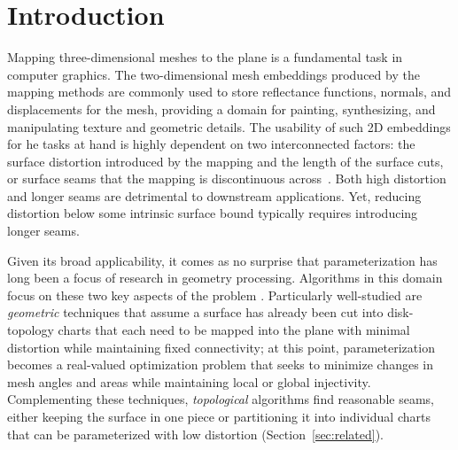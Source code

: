 
\section{Introduction}
Mapping three-dimensional meshes to the plane is a fundamental task in computer graphics.  The two-dimensional mesh embeddings produced by the mapping methods are commonly used to store reflectance functions, normals, and displacements
for the mesh, providing a domain for painting, synthesizing, and manipulating texture and geometric details. 
The usability of such 2D embeddings for he tasks at hand is highly dependent on two interconnected factors: the surface distortion introduced by the mapping and the length of the surface cuts, or surface seams that the mapping is discontinuous across~\cite{Sheffer07_ParameterizationSurvey,Hormann2008}. Both high distortion and longer seams are detrimental to downstream applications. Yet, reducing distortion below some intrinsic surface bound typically requires introducing longer seams. 

Given its broad applicability, it comes as no surprise that parameterization has long been a focus of research in geometry processing.  Algorithms in this domain focus on these two key aspects of the problem \cite{Sheffer07_ParameterizationSurvey,Hormann2008}.  Particularly well-studied are \emph{geometric} techniques that assume a surface has already been cut into disk-topology charts that each need to be mapped into the plane with minimal distortion while maintaining fixed connectivity; at this point, parameterization becomes a real-valued optimization problem that seeks to minimize changes in mesh angles and areas while maintaining local or global injectivity. Complementing these techniques, \emph{topological} algorithms find reasonable seams, either keeping the surface in one piece or partitioning it into individual charts that can be parameterized with low distortion (Section~\ref{sec:related}).   

